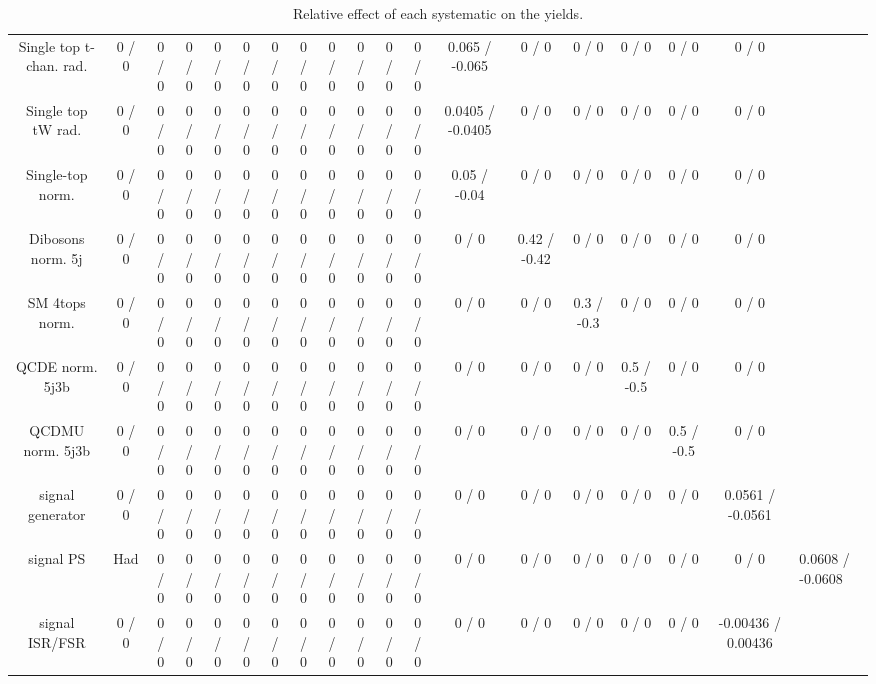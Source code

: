 \documentclass[10pt]{article}
\begin{document}
\begin{table}[htbp]
\begin{center}
\begin{tabular}{|c|c|c|c|c|c|c|c|c|c|c|c|c|c|c|c|c|c|}
  Single top t-chan. rad. & 0 / 0 & 0 / 0 & 0 / 0 & 0 / 0 & 0 / 0 & 0 / 0 & 0 / 0 & 0 / 0 & 0 / 0 & 0 / 0 & 0 / 0 & 0.065 / -0.065 & 0 / 0 & 0 / 0 & 0 / 0 & 0 / 0 & 0 / 0 \\ 
  Single top tW rad. & 0 / 0 & 0 / 0 & 0 / 0 & 0 / 0 & 0 / 0 & 0 / 0 & 0 / 0 & 0 / 0 & 0 / 0 & 0 / 0 & 0 / 0 & 0.0405 / -0.0405 & 0 / 0 & 0 / 0 & 0 / 0 & 0 / 0 & 0 / 0 \\ 
  Single-top norm. & 0 / 0 & 0 / 0 & 0 / 0 & 0 / 0 & 0 / 0 & 0 / 0 & 0 / 0 & 0 / 0 & 0 / 0 & 0 / 0 & 0 / 0 & 0.05 / -0.04 & 0 / 0 & 0 / 0 & 0 / 0 & 0 / 0 & 0 / 0 \\ 
  Dibosons norm. 5j & 0 / 0 & 0 / 0 & 0 / 0 & 0 / 0 & 0 / 0 & 0 / 0 & 0 / 0 & 0 / 0 & 0 / 0 & 0 / 0 & 0 / 0 & 0 / 0 & 0.42 / -0.42 & 0 / 0 & 0 / 0 & 0 / 0 & 0 / 0 \\ 
  SM 4tops norm. & 0 / 0 & 0 / 0 & 0 / 0 & 0 / 0 & 0 / 0 & 0 / 0 & 0 / 0 & 0 / 0 & 0 / 0 & 0 / 0 & 0 / 0 & 0 / 0 & 0 / 0 & 0.3 / -0.3 & 0 / 0 & 0 / 0 & 0 / 0 \\ 
  QCDE norm. 5j3b & 0 / 0 & 0 / 0 & 0 / 0 & 0 / 0 & 0 / 0 & 0 / 0 & 0 / 0 & 0 / 0 & 0 / 0 & 0 / 0 & 0 / 0 & 0 / 0 & 0 / 0 & 0 / 0 & 0.5 / -0.5 & 0 / 0 & 0 / 0 \\ 
  QCDMU norm. 5j3b & 0 / 0 & 0 / 0 & 0 / 0 & 0 / 0 & 0 / 0 & 0 / 0 & 0 / 0 & 0 / 0 & 0 / 0 & 0 / 0 & 0 / 0 & 0 / 0 & 0 / 0 & 0 / 0 & 0 / 0 & 0.5 / -0.5 & 0 / 0 \\ 
  signal generator & 0 / 0 & 0 / 0 & 0 / 0 & 0 / 0 & 0 / 0 & 0 / 0 & 0 / 0 & 0 / 0 & 0 / 0 & 0 / 0 & 0 / 0 & 0 / 0 & 0 / 0 & 0 / 0 & 0 / 0 & 0 / 0 & 0.0561 / -0.0561 \\ 
  signal PS & Had & 0 / 0 & 0 / 0 & 0 / 0 & 0 / 0 & 0 / 0 & 0 / 0 & 0 / 0 & 0 / 0 & 0 / 0 & 0 / 0 & 0 / 0 & 0 / 0 & 0 / 0 & 0 / 0 & 0 / 0 & 0 / 0 & 0.0608 / -0.0608 \\ 
  signal ISR/FSR & 0 / 0 & 0 / 0 & 0 / 0 & 0 / 0 & 0 / 0 & 0 / 0 & 0 / 0 & 0 / 0 & 0 / 0 & 0 / 0 & 0 / 0 & 0 / 0 & 0 / 0 & 0 / 0 & 0 / 0 & 0 / 0 & -0.00436 / 0.00436 \\ 
\hline 
\end{tabular} 
\caption{Relative effect of each systematic on the yields.} 
\end{center} 
\end{table} 
\end{document}
